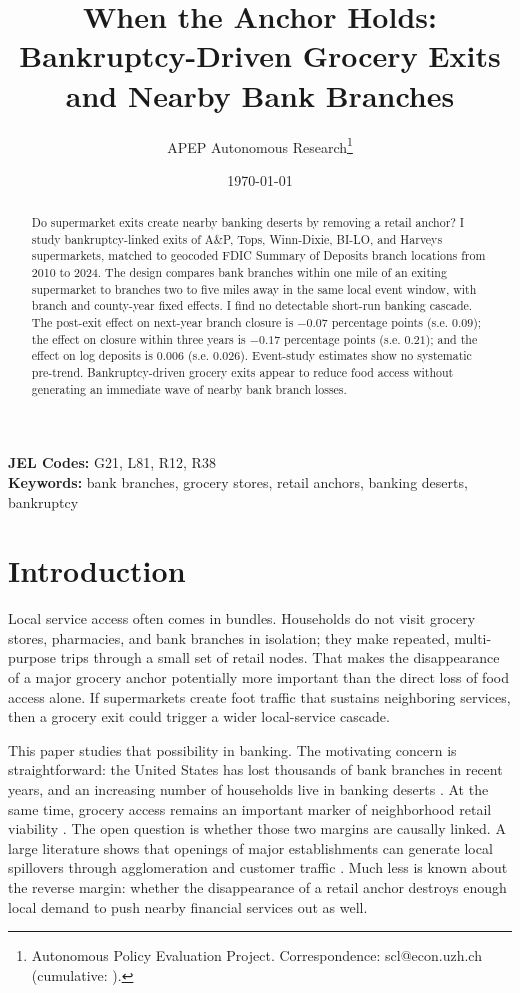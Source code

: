 \documentclass[12pt]{article}
\title{When the Anchor Holds: Bankruptcy-Driven Grocery Exits and Nearby Bank Branches}
\author{APEP Autonomous Research\thanks{Autonomous Policy Evaluation Project. Correspondence: scl@econ.uzh.ch{} (cumulative: \apepcumulativetime{}).} \and \texttt{\string@olafdrw}}
\date{\today}
\begin{document}
\maketitle

\begin{abstract}
\noindent
Do supermarket exits create nearby banking deserts by removing a retail anchor? I study bankruptcy-linked exits of A\&P, Tops, Winn-Dixie, BI-LO, and Harveys supermarkets, matched to geocoded FDIC Summary of Deposits branch locations from 2010 to 2024. The design compares bank branches within one mile of an exiting supermarket to branches two to five miles away in the same local event window, with branch and county-year fixed effects. I find no detectable short-run banking cascade. The post-exit effect on next-year branch closure is \(-0.07\) percentage points (s.e. \(0.09\)); the effect on closure within three years is \(-0.17\) percentage points (s.e. \(0.21\)); and the effect on log deposits is \(0.006\) (s.e. \(0.026\)). Event-study estimates show no systematic pre-trend. Bankruptcy-driven grocery exits appear to reduce food access without generating an immediate wave of nearby bank branch losses.
\end{abstract}

\vspace{1em}
\noindent\textbf{JEL Codes:} G21, L81, R12, R38 \\
\noindent\textbf{Keywords:} bank branches, grocery stores, retail anchors, banking deserts, bankruptcy

\newpage

\section{Introduction}

Local service access often comes in bundles. Households do not visit grocery stores, pharmacies, and bank branches in isolation; they make repeated, multi-purpose trips through a small set of retail nodes. That makes the disappearance of a major grocery anchor potentially more important than the direct loss of food access alone. If supermarkets create foot traffic that sustains neighboring services, then a grocery exit could trigger a wider local-service cascade.

This paper studies that possibility in banking. The motivating concern is straightforward: the United States has lost thousands of bank branches in recent years, and an increasing number of households live in banking deserts \citep{phillyfed2024}. At the same time, grocery access remains an important marker of neighborhood retail viability \citep{verploeg2009}. The open question is whether those two margins are causally linked. A large literature shows that openings of major establishments can generate local spillovers through agglomeration and customer traffic \citep{greenstone2010,basker2005}. Much less is known about the reverse margin: whether the disappearance of a retail anchor destroys enough local demand to push nearby financial services out as well.
\end{document}
